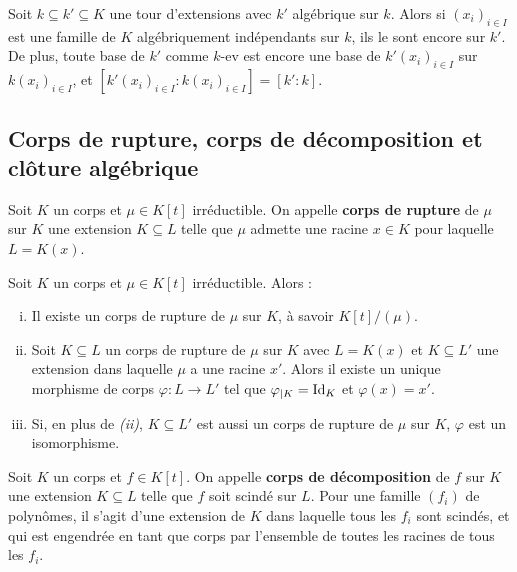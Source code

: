 	\begin{pop}
		Soit $k \subseteq  k' \subseteq K$ une tour d'extensions avec $k'$ algébrique sur $k$.
		Alors si $(x_i)_{i \in I}$ est une famille de $K$ algébriquement indépendants sur $k$, ils le sont encore sur $k'$.
		De plus, toute base de $k'$ comme $k$-ev est encore une base de $k'(x_i)_{i \in I}$ sur $k(x_i)_{i \in I}$, et $[k'(x_i)_{i \in I} : k(x_i)_{i \in I}] = [k' : k]$.
	\end{pop}



\subsection{Corps de rupture, corps de décomposition et clôture algébrique}

	\begin{defn}
		Soit $K$ un corps et $\mu \in K[t]$ irréductible.
		On appelle \textbf{corps de rupture} de $\mu$ sur $K$ une extension $K \subseteq L$ telle que $\mu$ admette une racine $x \in K$ pour laquelle $L = K(x)$.
	\end{defn}

	\begin{pop}
		Soit $K$ un corps et $\mu \in K[t]$ irréductible. Alors :
		\begin{enumerate}[(i)]
			\item Il existe un corps de rupture de $\mu$ sur $K$, à savoir $K[t]/(\mu)$.
			\item Soit $K \subseteq L$ un corps de rupture de $\mu$ sur $K$ avec $L = K(x)$ et $K \subseteq L'$ une extension dans laquelle $\mu$ a une racine $x'$.
				Alors il existe un unique morphisme de corps $\varphi \colon L \to L'$ tel que $\varphi_{|K} = \operatorname{Id}_K$ et $\varphi(x) = x'$.
			\item Si, en plus de \textit{(ii)}, $K \subseteq L'$ est aussi un corps de rupture de $\mu$ sur $K$, $\varphi$ est un isomorphisme.
		\end{enumerate}
	\end{pop}

	\begin{defn}
		Soit $K$ un corps et $f \in K[t]$.
		On appelle \textbf{corps de décomposition} de $f$ sur $K$ une extension $K \subseteq L$ telle que $f$ soit scindé sur $L$.
		Pour une famille $(f_i)$ de polynômes, il s'agit d'une extension de $K$ dans laquelle tous les $f_i$ sont scindés, et qui est engendrée en tant que corps par l'ensemble de toutes les racines de tous les $f_i$.
	\end{defn}

